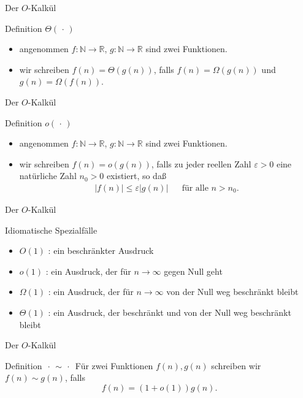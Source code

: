 \documentclass[aspectratio=1610, 11pt]{beamer}
\newcommand\nix{\,\cdot\,}
\newcommand\NN{\mathbb N}
\newcommand\RR{\mathbb R}
\newcommand{\eps}{\varepsilon}
\begin{document}
\begin{frame}{Der $O$-Kalk\"ul}
	\begin{block}{Definition $\Theta(\nix)$}
		\begin{itemize}
			\item angenommen $f:\NN\to\RR$, $g:\NN\to\RR$ sind zwei Funktionen.
			\item wir schreiben $f(n)=\Theta(g(n))$, falls $f(n)=\Omega(g(n))$ und $g(n)=\Omega(f(n))$.
		\end{itemize}
	\end{block}
\end{frame}

\begin{frame}{Der $O$-Kalk\"ul}
	\begin{block}{Definition $o(\nix)$}
		\begin{itemize}
			\item angenommen $f:\NN\to\RR$, $g:\NN\to\RR$ sind zwei Funktionen.
			\item wir schreiben $f(n)=o(g(n))$, falls zu jeder reellen Zahl $\eps>0$ eine nat\"urliche Zahl $n_0>0$ existiert, so da\ss\
				\begin{align*}|f(n)|\leq\eps|g(n)|&&\mbox{f\"ur alle }n>n_0.\end{align*}
		\end{itemize}
	\end{block}
\end{frame}

\begin{frame}{Der $O$-Kalk\"ul}
	\begin{exampleblock}{Idiomatische Spezialf\"alle}
		\begin{itemize}
			\item $O(1)$ : ein beschr\"ankter Ausdruck
			\item $o(1)$ : ein Ausdruck, der f\"ur $n\to\infty$ gegen Null geht
			\item $\Omega(1)$ : ein Ausdruck, der f\"ur $n\to\infty$ von der Null weg beschr\"ankt bleibt
			\item $\Theta(1)$ : ein Ausdruck, der beschr\"ankt und von der Null weg beschr\"ankt bleibt
		\end{itemize}
	\end{exampleblock}
\end{frame}

\begin{frame}{Der $O$-Kalk\"ul}
	\begin{block}{Definition $\nix\sim\nix$}
F\"ur zwei Funktionen $f(n),g(n)$ schreiben wir $f(n)\sim g(n)$, falls $$f(n)=(1+o(1))g(n).$$
	\end{block}
\end{frame}
\end{document}
